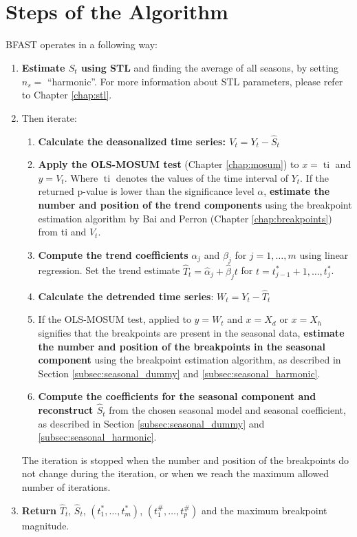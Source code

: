 \documentclass[main.tex]{subfiles}
\begin{document}
\section{Steps of the Algorithm}
\label{sec:bfast_algorithm_steps}
BFAST operates in a following way:
\begin{enumerate}
\item \textbf{Estimate $\hat{S}_t$ using STL} and finding the average of all seasons, by
  setting $n_s =$ ``harmonic''. For more information about STL parameters,
  please refer to Chapter \ref{chap:stl}.
\item Then iterate:
  \begin{enumerate}[1)]
    \item \textbf{Calculate the deasonalized time series: $V_t = Y_t - \hat{S}_t$}
    \item \textbf{Apply the OLS-MOSUM test} (Chapter \ref{chap:mosum}) to $x=\operatorname{ti}$ and
      $y = V_t$. Where $\operatorname{ti}$ denotes the values of the time interval of $Y_t$.
      If the returned p-value is lower than the significance level $\alpha$,
      \textbf{estimate the number and position of the trend components} using the
      breakpoint estimation algorithm by Bai and Perron (Chapter
      \ref{chap:breakpoints}) from ti and $V_t$.
    \item \textbf{Compute the trend coefficients} $\alpha_j$ and $\beta_j$ for
      $j = 1, \hdots, m$ using linear regression. Set the trend estimate
      $\hat{T}_t = \hat{\alpha}_j + \hat{\beta}_j t$ for
      $t = t^*_{j-1} + 1, \hdots, t^*_j$.
    \item \textbf{Calculate the detrended time series}: $W_t = Y_t - \hat{T}_t$
    \item If the OLS-MOSUM test, applied to $y=W_t$ and $x = X_{d}$ or $x =X_{h}$
      signifies that the breakpoints are present in the
      seasonal data, \textbf{estimate the number and position of the
      breakpoints in the seasonal component} using the breakpoint estimation
      algorithm, as described in Section \ref{subsec:seasonal_dummy} and
      \ref{subsec:seasonal_harmonic}.
    \item \textbf{Compute the coefficients for the seasonal component
      and reconstruct $\hat{S}_t$} from the chosen seasonal model and seasonal
      coefficient, as described in Section \ref{subsec:seasonal_dummy} and
      \ref{subsec:seasonal_harmonic}.
  \end{enumerate}
  The iteration is stopped when the number and position of the breakpoints do
  not change during the iteration, or when we reach the maximum allowed number of iterations.
\item \textbf{Return} $\hat{T}_t$, $\hat{S}_t$, $(t_1^*, \hdots, t_m^*)$, $(t_1^{\#}, \hdots, t_p^{\#})$
  and the maximum breakpoint magnitude.
\end{enumerate}
\end{document}
